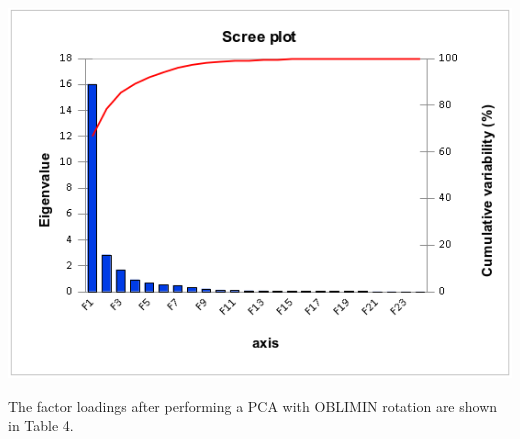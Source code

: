 \documentclass[12pt,a4paper]{article}
\begin{document}
\includegraphics[scale=0.6]{scree.png}
\begingroup
{}
\endgroup
\hfill\break

The factor loadings after performing a PCA with OBLIMIN rotation are shown in Table 4.
\end{document}
